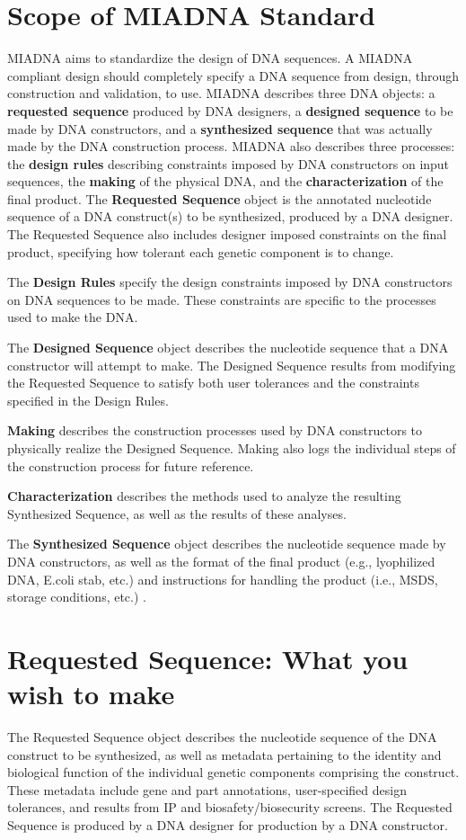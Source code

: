 \documentclass[12pt,letterpaper,english]{article}
\begin{document}
\section{Scope of MIADNA Standard}
MIADNA aims to standardize the design of DNA sequences. A MIADNA compliant design should completely specify a DNA sequence from design, through construction and validation, to use. MIADNA describes three DNA objects: a \textbf{requested sequence} produced by DNA designers, a \textbf{designed sequence} to be made by DNA constructors, and a \textbf{synthesized sequence} that was actually made by the DNA construction process. MIADNA also describes three processes: the \textbf{design rules} describing constraints imposed by DNA constructors on input sequences, the \textbf{making} of the physical DNA, and the \textbf{characterization} of the final product.
The \textbf{Requested Sequence} object is the annotated nucleotide sequence of a DNA construct(s) to be synthesized, produced by a DNA designer. The Requested Sequence also includes designer imposed constraints on the final product, specifying how tolerant each genetic component is to change. \par
The \textbf{Design Rules} specify the design constraints imposed by DNA constructors on DNA sequences to be made. These constraints are specific to the processes used to make the DNA. \par
The \textbf{Designed Sequence} object describes the nucleotide sequence that a DNA constructor will attempt to make. The Designed Sequence results from modifying the Requested Sequence to satisfy both user tolerances and the constraints specified in the Design Rules. \par
\textbf{Making} describes the construction processes used by DNA constructors to physically realize the Designed Sequence. Making also logs the individual steps of the construction process for future reference. \par
\textbf{Characterization} describes the methods used to analyze the resulting Synthesized Sequence, as well as the results of these analyses. \par
The \textbf{Synthesized Sequence} object describes the nucleotide sequence made by DNA constructors, as well as the format of the final product (e.g., lyophilized DNA, E.coli stab, etc.) and instructions for handling the product (i.e., MSDS, storage conditions, etc.) .\par

\section{Requested Sequence: What you wish to make}
The Requested Sequence object describes the nucleotide sequence of the DNA construct to be synthesized, as well as metadata pertaining to the identity and biological function of the individual genetic components comprising the construct. These metadata include gene and part annotations, user-specified design tolerances, and results from IP and biosafety/biosecurity screens. The Requested Sequence is produced by a DNA designer for production by a DNA constructor. \par
\end{document}

